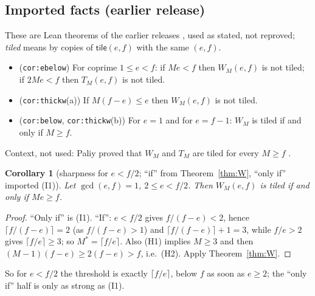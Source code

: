 \documentclass[11pt,reqno]{amsart}
\theoremstyle{plain}
\newtheorem{corollary}[theorem]{Corollary}
\theoremstyle{definition}
\newcommand{\tile}{\mathsf{tile}}
\begin{document}
\subsection{Imported facts (earlier release)}\label{sub:import}
These are Lean theorems of the earlier releases \cite{ReleasePaper,Release22}, used as stated, not reproved; \emph{tiled} means by copies of $\tile(e,f)$ with the same $(e,f)$.
\begin{itemize}\itemsep1pt
\item[(I1)] (\texttt{cor:ebelow}) For coprime $1\le e<f$: if $Me<f$ then $W_M(e,f)$ is not tiled; if $2Me<f$ then $T_M(e,f)$ is not tiled.
\item[(I2)] (\texttt{cor:thickw}(a)) If $M(f-e)\le e$ then $W_M(e,f)$ is not tiled.
\item[(I3)] (\texttt{cor:below}, \texttt{cor:thickw}(b)) For $e=1$ and for $e=f-1$: $W_M$ is tiled if and only if $M\ge f$.
\end{itemize}
Context, not used: Paliy proved that $W_M$ and $T_M$ are tiled for every $M\ge f$ \cite{PaliyRepo}.
\begin{corollary}[sharpness for $e<f/2$; ``if'' from Theorem~\ref{thm:W}, ``only if'' imported (I1)]\label{cor:sharp}
Let $\gcd(e,f)=1$, $2\le e<f/2$. Then $W_M(e,f)$ is tiled if and only if $Me\ge f$.
\end{corollary}
\begin{proof}
``Only if'' is (I1). ``If'': $e<f/2$ gives $f/(f-e)<2$, hence $\lceil f/(f-e)\rceil=2$ (as $f/(f-e)>1$) and $\lceil f/(f-e)\rceil+1=3$, while $f/e>2$ gives $\lceil f/e\rceil\ge3$; so $M^*=\lceil f/e\rceil$. Also (H1) implies $M\ge3$ and then $(M-1)(f-e)\ge2(f-e)>f$, i.e.\ (H2). Apply Theorem~\ref{thm:W}.
\end{proof}
So for $e<f/2$ the threshold is exactly $\lceil f/e\rceil$, below $f$ as soon as $e\ge2$; the ``only if'' half is only as strong as (I1).

\end{document}
